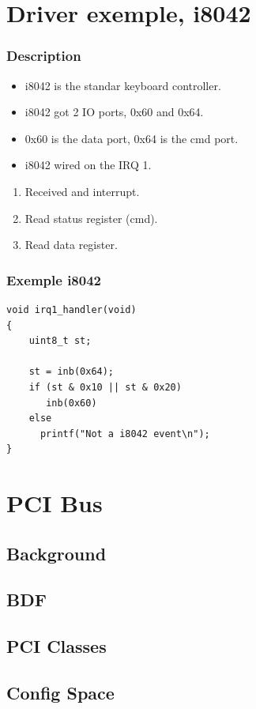 \section{Driver exemple, i8042}

\begin{frame}
\frametitle{Description}
\begin{itemize}
\item i8042 is the standar keyboard controller.
\item i8042 got 2 IO ports, 0x60 and 0x64.
\item 0x60 is the data port, 0x64 is the cmd port.
\item i8042 wired on the IRQ 1.
\end{itemize}
\end{frame}

\begin{frame}
\begin{enumerate}
\item Received and interrupt.
\item Read status register (cmd).
\item Read data register.
\end{enumerate}
\end{frame}

\begin{frame}[fragile]
\frametitle{Exemple i8042}
\begin{verbatim}
void irq1_handler(void)
{
    uint8_t st;

    st = inb(0x64);
    if (st & 0x10 || st & 0x20)
       inb(0x60)
    else
      printf("Not a i8042 event\n");
}
\end{verbatim}
\end{frame}


\section{PCI Bus}
\subsection*{Background}
\subsection{BDF}
\subsection{PCI Classes}
\subsection{Config Space}
